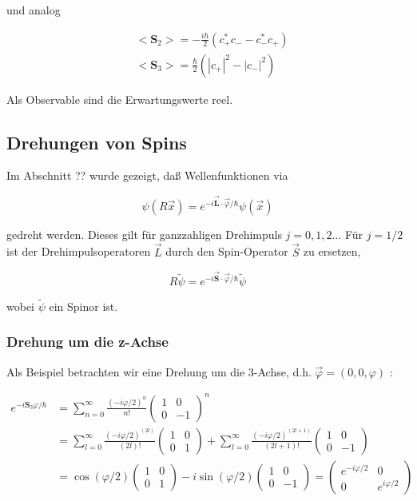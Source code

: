\documentclass[10pt, letterpaper]{article}
\begin{document}
und analog

$$
\begin{aligned}
& <\mathbf{S}_{2}>=-\frac{i \hbar}{2}\left(c_{+}^{*} c_{-}-c_{-}^{*} c_{+}\right) \\
& <\mathbf{S}_{3}>=\frac{\hbar}{2}\left(\left|c_{+}\right|^{2}-\left|c_{-}\right|^{2}\right)
\end{aligned}
$$

Als Observable sind die Erwartungswerte reel.

\subsection*{Drehungen von Spins}
Im Abschnitt ?? wurde gezeigt, daß Wellenfunktionen via

$$
\psi(R \vec{x})=e^{-i \overrightarrow{\mathbf{L}} \cdot \vec{\varphi} / \hbar} \psi(\vec{x})
$$

gedreht werden. Dieses gilt für ganzzahligen Drehimpuls $j=0,1,2 \ldots$ Für $j=1 / 2$ ist der Drehimpulsoperatoren $\vec{L}$ durch den Spin-Operator $\vec{S}$ zu ersetzen,

$$
R \tilde{\psi}=e^{-i \overrightarrow{\mathbf{S}} \cdot \vec{\varphi} / \hbar} \tilde{\psi}
$$

wobei $\tilde{\psi}$ ein Spinor ist.

\subsubsection*{Drehung um die z-Achse}
Als Beispiel betrachten wir eine Drehung um die 3-Achse, d.h. $\vec{\varphi}=(0,0, \varphi)$ :

$$
\begin{aligned}
e^{-i \mathbf{S}_{3} \varphi / \hbar} & =\sum_{n=0}^{\infty} \frac{(-i \varphi / 2)^{n}}{n!}\left(\begin{array}{cc}
1 & 0 \\
0 & -1
\end{array}\right)^{n} \\
& =\sum_{l=0}^{\infty} \frac{(-i \varphi / 2)^{(2 l)}}{(2 l)!}\left(\begin{array}{ll}
1 & 0 \\
0 & 1
\end{array}\right)+\sum_{l=0}^{\infty} \frac{(-i \varphi / 2)^{(2 l+1)}}{(2 l+1)!}\left(\begin{array}{cc}
1 & 0 \\
0 & -1
\end{array}\right) \\
& =\cos (\varphi / 2)\left(\begin{array}{ll}
1 & 0 \\
0 & 1
\end{array}\right)-i \sin (\varphi / 2)\left(\begin{array}{cc}
1 & 0 \\
0 & -1
\end{array}\right)=\left(\begin{array}{cc}
e^{-i \varphi / 2} & 0 \\
0 & e^{i \varphi / 2}
\end{array}\right)
\end{aligned}
$$
\end{document}
